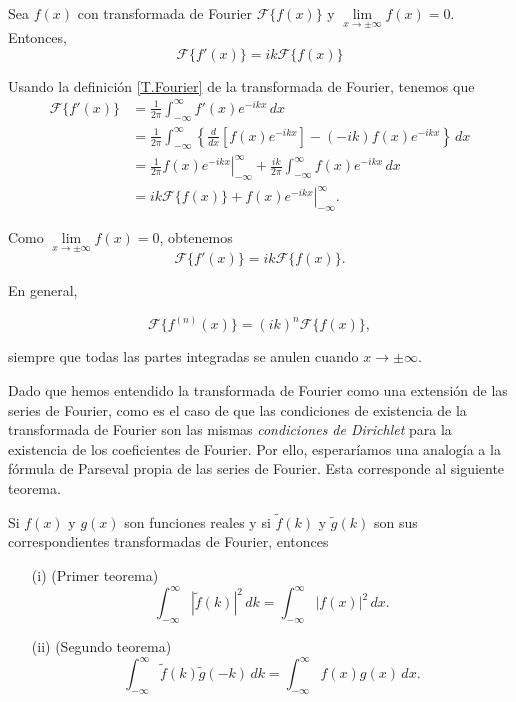 \begin{propo}
Sea $f(x)$ con transformada de Fourier $\mathcal{F}\{f(x)\}$ y $\lim\limits_{x \to \pm \infty} f(x) = 0$. Entonces, 
$$\boxed{\mathcal{F}\{f'(x)\} = i k \mathcal{F}\{f(x)\}}$$
\end{propo}

\begin{demo}
Usando la definición \eqref{T.Fourier} de la transformada de Fourier, tenemos que 
\begin{align*}
    \mathcal{F}\{f'(x)\} &= \frac{1}{2\pi} \int_{- \infty}^{\infty} f'(x) e^{-ikx} \,dx \\
    &= \frac{1}{2\pi} \int_{- \infty}^{\infty} \left\{ \frac{d}{dx}\left[ f(x) e^{-ikx} \right]  - (-ik) f(x) e^{-ikx} \right\}\,dx \\
    &= \frac{1}{2\pi} \left. f(x) e^{-ikx} \right|_{-\infty}^{\infty} + \frac{ik}{2\pi} \int_{- \infty}^{\infty}  f(x) e^{-ikx} \,dx \\
    &=  ik \mathcal{F}\{f(x)\} + \left. f(x) e^{-ikx} \right|_{-\infty}^{\infty}.
\end{align*}

Como  $\lim\limits_{x \to \pm \infty} f(x) = 0$, obtenemos
$$\mathcal{F}\{f'(x)\} = i k \mathcal{F}\{f(x)\}.$$
\end{demo}

En general,
\begin{shaded}
$$\mathcal{F}\{f^{(n)} (x)\} = (i k)^n \mathcal{F}\{f(x)\},$$    
\end{shaded}

siempre que todas las partes integradas se anulen cuando $x \to \pm \infty$.

Dado que hemos entendido la transformada de Fourier como una extensión de las series de Fourier, como es el caso de que las condiciones de existencia de la transformada de Fourier son las mismas \emph{condiciones de Dirichlet} para la existencia de los coeficientes de Fourier. Por ello, esperaríamos una analogía a la fórmula de Parseval propia de las series de Fourier. Esta corresponde al siguiente teorema.

\begin{teorema}[de Parseval]
Si $f(x)$ y $g(x)$ son funciones reales y si $\tilde{f}(k)$ y $\tilde{g}(k)$ son sus correspondientes transformadas de Fourier, entonces

\begin{itemize}
    \item[(i)] (Primer teorema)
    $$\int_{-\infty}^{\infty} |\tilde{f}(k)|^2\, dk = \int_{-\infty}^{\infty} |f(x)|^2 \, dx. $$
    
    \item[(ii)] (Segundo teorema)
    $$\int_{-\infty}^{\infty} \tilde{f}(k) \tilde{g}(-k) \, dk = \int_{-\infty}^{\infty} f(x) g(x) \, dx. $$
    
\end{itemize}
\end{teorema}

